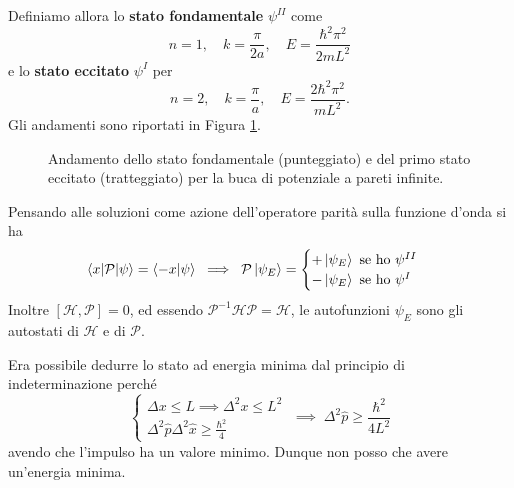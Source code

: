 \bigskip
\noindent
Definiamo allora lo \textbf{stato fondamentale} \( \psi^{II} \) come
\[
n = 1, \quad k = \frac{\pi}{2a}, \quad E = \frac{\hbar^2 \pi^2}{2 m L^2}
\]
e lo \textbf{stato eccitato} \( \psi^I \) per
\[
n = 2, \quad k = \frac{\pi}{a}, \quad E = \frac{2 \hbar^2 \pi^2}{m L^2}.
\]
Gli andamenti sono riportati in Figura \ref{buca_infinita}.
\begin{figure}
\centering
{}
\caption{Andamento dello stato fondamentale (punteggiato) e del primo stato eccitato (tratteggiato) per la buca di potenziale a pareti infinite.}
\label{buca_infinita}
\end{figure}
Pensando alle soluzioni come azione dell'operatore parità sulla funzione d'onda si ha
\[
\braket{x|\mathcal{P}|\psi} = \braket{-x|\psi} \; \implies \; \mathcal{P} \ket{\psi_E} = \begin{cases}
+ \ket{\psi_E} \text{ se ho } \psi^{II} \\
- \ket{\psi_E} \text{ se ho } \psi^I 
\end{cases}
\]
Inoltre \([\mathcal{H}, \mathcal{P}] = 0\), ed essendo \( \mathcal{P}^{-1} \mathcal{H} \mathcal{P} = \mathcal{H} \), le autofunzioni \( \psi_E \) sono gli autostati di \( \mathcal{H} \) e di \( \mathcal{P} \).

\bigskip
\noindent
Era possibile dedurre lo stato ad energia minima dal principio di indeterminazione perché 
\[
\begin{cases}
\Delta x \leq L \implies \Delta^2 x \leq L^2 \\
\Delta^2 \hat{p} \Delta^2 \hat{x} \geq \frac{\hbar^2}{4}
\end{cases} \; \implies \; \Delta^2 \hat{p} \geq \frac{\hbar^2}{4L^2}
\]
avendo che l'impulso ha un valore minimo. Dunque non posso che avere un'energia minima.
